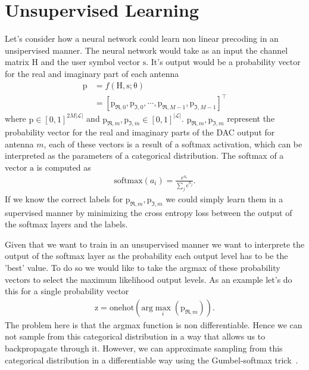 \documentclass[12pt]{article}
\newcommand{\vect}[1]{\boldsymbol{\mathrm{#1}}}
\newcommand{\mat}[1]{\boldsymbol{\mathrm{#1}}}
\theoremstyle{remark}
\begin{document}
\section{Unsupervised Learning}
Let's consider how a neural network could learn non linear precoding in an unsipervised manner. 
The neural network would take as an input the channel matrix $\mat{H}$ and the user symbol vector $\vect{s}$. It's output would be a probability vector for the real and imaginary part of each antenna
\begin{align}
	\vect{p} &= f(\mat{H}, \vect{s}; \vect{\theta})\\
	&= [\vect{p}_{\Re, 0}, \vect{p}_{\Im, 0}, \cdots , \vect{p}_{\Re, M-1}, \vect{p}_{\Im, M-1}]^{\intercal}
\end{align}
where $\vect{p} \in [0, 1]^{2M|\mathcal{L}|}$ and $\vect{p}_{\Re, m}, \vect{p}_{\Im, m} \in [0, 1]^{|\mathcal{L}|}$. $\vect{p}_{\Re, m}, \vect{p}_{\Im, m}$ represent the probability vector for the real and imaginary parts of the DAC output for antenna $m$, each of these vectors is a result of a softmax activation, which can be interpreted as the parameters of a categorical distribution. The softmax of a vector $\vect{a}$ is computed as 
\begin{align}
	\mathrm{softmax}(a_i) = \frac{e^{a_i}}{\sum_j e^{a_j}}.
\end{align}
If we know the correct labels for $\vect{p}_{\Re, m}, \vect{p}_{\Im, m}$ we could simply learn them in a supervised manner by minimizing the cross entropy loss between the output of the softmax layers and the labels. 

Given that we want to train in an unsupervised manner we want to interprete the output of the softmax layer as the probability each output level has to be the 'best' value. To do so we would like to take the argmax of these probability vectors to select the maximum likelihood output levels. As an example let's do this for a single probability vector
\begin{align}
	\vect{z} = \mathrm{onehot}\left(\mathrm{arg}\max_i \left(\vect{p}_{\Re, m}\right)\right).
\end{align}
The problem here is that the argmax function is non differentiable. Hence we can not sample from this categorical distribution in a way that allows us to backpropagate through it. 
However, we can approximate sampling from this categorical distribution in a differentiable way using the Gumbel-softmax trick~\cite{gumbel_softmax, concrete_dist}.
\end{document}
